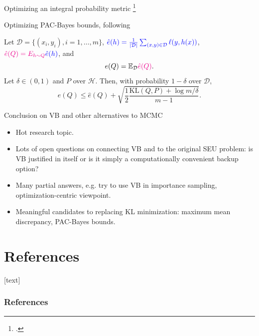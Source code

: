 \documentclass[10pt]{beamer}
\newcommand\un[1]{\textcolor{magenta}{#1}}
\newcommand\unn[1]{\textcolor{blue}{#1}}
\def\blank{\vspace{.5\textheight}}
\begin{document}
\begin{frame}{
  Optimizing an integral probability metric \footcite{TGRO21}
}
\blank
\end{frame}

\begin{frame}{
  Optimizing PAC-Bayes bounds, following \cite{DzRo17}
}
\begin{theorem}
  Let $\mathcal{D} = \{(x_i,y_i), i=1, \dots, m\}$, $\unn{\hat{e}(h) = \frac{1}{\vert \mathcal{D}\vert} \sum_{(x,y)\in\mathcal{D}}\ell(y,h(x))}$, $\un{\hat{e}(Q) = \mathbb \mathbb{E}_{h\sim Q} \unn{\hat{e}(h)}}$, and
  $$
  e(Q) = \mathbb{E}_{\mathcal{D}} \un{\hat{e}(Q)}.
  $$
  Let $\delta\in(0,1)$ and $P$ over $\mathcal{H}$. Then, with probability $1-\delta$ over $\mathcal{D}$, 
  $$
    e(Q) \leq \hat{e}(Q) + \sqrt{\frac12 \frac{\mathrm{KL}(Q,P) + \log m/\delta}{m-1}}.
  $$
\end{theorem}
\blank
\end{frame}

\begin{frame}{Conclusion on VB and other alternatives to MCMC}
  \begin{itemize}
    \item Hot research topic.
    \item Lots of open questions on connecting VB and to the original SEU problem: is VB justified in itself or is it simply a computationally convenient backup option?
    \item Many partial answers, e.g. try to use VB in importance sampling, optimization-centric viewpoint.
    \item Meaningful candidates to replacing KL minimization: maximum mean discrepancy, PAC-Bayes bounds.
  \end{itemize}
\end{frame}



\section*{References}
[text]%
\begin{frame}[allowframebreaks]
\frametitle{References}
\small
\printbibliography
\normalsize
\end{frame}
\end{document}
